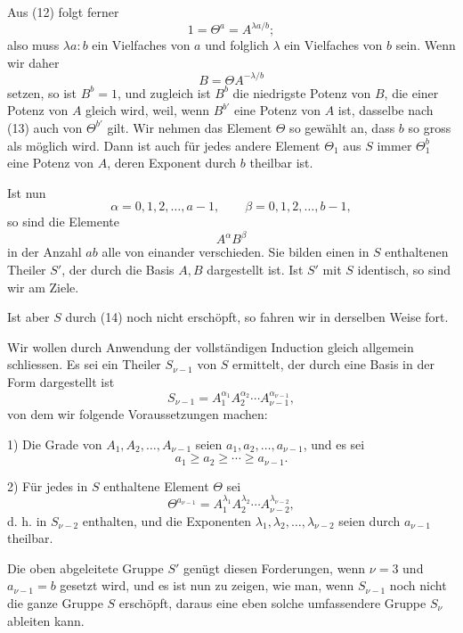 \documentclass[11pt]{article}
\begin{document}
Aus (12) folgt ferner
\[
1=\Theta^a=A^{\lambda a/b};
\]
also muss $\lambda a:b$ ein Vielfaches von $a$ und folglich $\lambda$ ein Vielfaches von $b$ sein. Wenn wir daher
\begin{equation}
B=\Theta A^{-\lambda/b}
\tag{13}
\end{equation}
setzen, so ist $B^b=1$, und zugleich ist $B^b$ die niedrigste Potenz von $B$, die einer Potenz von $A$ gleich wird, weil, wenn $B^{b'}$ eine Potenz von $A$ ist, dasselbe nach (13) auch von $\Theta^{b'}$ gilt. Wir nehmen das Element $\Theta$ so gewählt an, dass $b$ so gross als möglich wird. Dann ist auch für jedes andere Element $\Theta_1$ aus $S$ immer $\Theta_1^b$ eine Potenz von $A$, deren Exponent durch $b$ theilbar ist.

Ist nun
\[
\alpha=0,1,2,\ldots,a-1,
\qquad
\beta=0,1,2,\ldots,b-1,
\]
so sind die Elemente
\begin{equation}
A^\alpha B^\beta
\tag{14}
\end{equation}
in der Anzahl $ab$ alle von einander verschieden. Sie bilden einen in $S$ enthaltenen Theiler $S'$, der durch die Basis $A,B$ dargestellt ist. Ist $S'$ mit $S$ identisch, so sind wir am Ziele.

Ist aber $S$ durch (14) noch nicht erschöpft, so fahren wir in derselben Weise fort.

Wir wollen durch Anwendung der vollständigen Induction gleich allgemein schliessen. Es sei ein Theiler $S_{\nu-1}$ von $S$ ermittelt, der durch eine Basis in der Form dargestellt ist
\begin{equation}
S_{\nu-1}=A_1^{\alpha_1}A_2^{\alpha_2}\cdots A_{\nu-1}^{\alpha_{\nu-1}},
\tag{15}
\end{equation}
von dem wir folgende Voraussetzungen machen:

1) Die Grade von $A_1,A_2,\ldots,A_{\nu-1}$ seien $a_1,a_2,\ldots,a_{\nu-1}$, und es sei
\[
a_1\ge a_2\ge\cdots\ge a_{\nu-1}.
\]

2) Für jedes in $S$ enthaltene Element $\Theta$ sei
\begin{equation}
\Theta^{a_{\nu-1}}=A_1^{\lambda_1}A_2^{\lambda_2}\cdots A_{\nu-2}^{\lambda_{\nu-2}},
\tag{16}
\end{equation}
d. h. in $S_{\nu-2}$ enthalten, und die Exponenten $\lambda_1,\lambda_2,\ldots,\lambda_{\nu-2}$ seien durch $a_{\nu-1}$ theilbar.

Die oben abgeleitete Gruppe $S'$ genügt diesen Forderungen, wenn $\nu=3$ und $a_{\nu-1}=b$ gesetzt wird, und es ist nun zu zeigen, wie man, wenn $S_{\nu-1}$ noch nicht die ganze Gruppe $S$ erschöpft, daraus eine eben solche umfassendere Gruppe $S_\nu$ ableiten kann.
\end{document}
